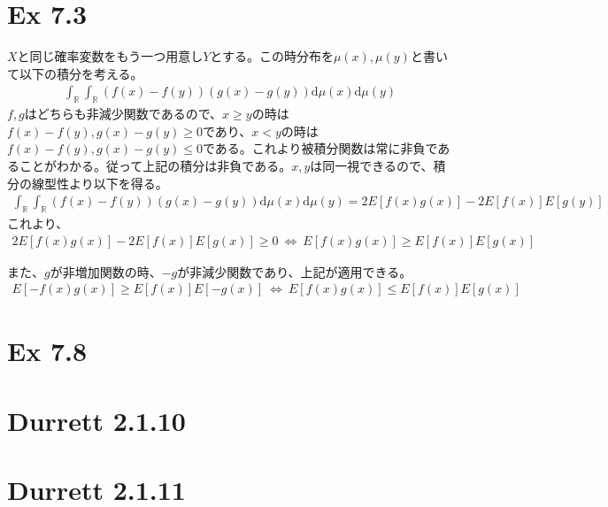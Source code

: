\documentclass{article}
\begin{document}
\section{Ex 7.3}
$X$と同じ確率変数をもう一つ用意し$Y$とする。この時分布を$\mu(x),\mu(y)$と書いて以下の積分を考える。
\begin{align*}
	\int_{\mathbb{R}}\int_{\mathbb{R}} \left( f(x) - f(y) \right)  \left( g(x) - g(y)\right) \mathrm{d}\mu(x) \mathrm{d}\mu(y)
\end{align*}
$f,g$はどちらも非減少関数であるので、$x \geq y$の時は$f(x) - f(y), g(x) - g(y) \geq 0$であり、$x < y$の時は$f(x) - f(y), g(x) - g(y) \leq 0$である。これより被積分関数は常に非負であることがわかる。従って上記の積分は非負である。$x,y$は同一視できるので、積分の線型性より以下を得る。
\begin{align*}
	\int_{\mathbb{R}}\int_{\mathbb{R}} \left( f(x) - f(y) \right)  \left( g(x) - g(y)\right) \mathrm{d}\mu(x) \mathrm{d}\mu(y) = 2 E \left[ f(x)g(x) \right] - 2E\left[ f(x) \right] E\left[ g(y) \right]
\end{align*}
これより、
\begin{align*}
	2 E \left[ f(x)g(x) \right] - 2E\left[ f(x) \right] E\left[ g(x) \right] \geq 0\ \Leftrightarrow\ E \left[ f(x)g(x) \right] \geq E\left[ f(x) \right] E\left[ g(x) \right]
\end{align*}

また、$g$が非増加関数の時、$-g$が非減少関数であり、上記が適用できる。
\begin{align*}
	E \left[ -f(x)g(x) \right] \geq E\left[ f(x) \right] E\left[ -g(x) \right] \ \Leftrightarrow\ E \left[ f(x)g(x) \right] \leq E\left[ f(x) \right] E\left[ g(x) \right]
\end{align*}

\section{Ex 7.8}

\section{Durrett 2.1.10}

\section{Durrett 2.1.11}
\end{document}
